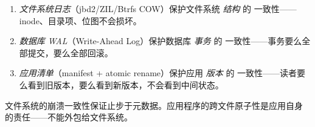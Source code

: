 \begin{filesystemlayout}
\begin{keyidea}
\begin{enumerate}\tightlist
\item \emph{文件系统日志}（jbd2/ZIL/Btrfs COW）保护文件系统 \emph{结构} 的
      一致性——inode、目录项、位图不会损坏。
\item \emph{数据库 WAL}（Write-Ahead Log）保护数据库 \emph{事务} 的
      一致性——事务要么全部提交，要么全部回滚。
\item \emph{应用清单}（manifest + atomic rename）保护应用 \emph{版本} 的
      一致性——读者要么看到旧版本，要么看到新版本，不会看到中间状态。
\end{enumerate}

文件系统的崩溃一致性保证止步于元数据。应用程序的跨文件原子性是应用自身
的责任——不能外包给文件系统。
\end{keyidea}

\end{filesystemlayout}
